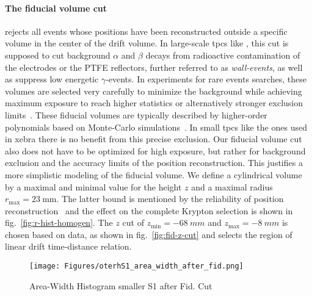 \paragraph{The fiducial volume cut} rejects all events whose positions have been reconstructed outside a specific volume in the center of the drift volume.
In large-scale \glspl{tpc} like \nton, this cut is supposed to cut background $\alpha$ and $\beta$ decays from radioactive contamination of the electrodes or the PTFE reflectors, further referred to as \emph{wall-events}, as well as suppress low energetic $ \gamma $-events.
In experiments for rare events searches, these volumes are selected very carefully to minimize the background while achieving maximum exposure to reach higher statistics or alternatively stronger exclusion limits~\cite{?}.  %
These fiducial volumes are typically described by higher-order polynomials based on Monte-Carlo simulations~\cite{?}. %
In small \glspl{tpc} like the ones used in \gls{xebra} there is no benefit from this precise exclusion.
Our fiducial volume cut also does not have to be optimized for high exposure, but rather for background exclusion and the accuracy limits of the position reconstruction.
This justifies a more simplistic modeling of the fiducial volume.
We define a cylindrical volume by a maximal and minimal value for the height $z$ and a maximal radius $r_\mathrm{max} = \SI{23}{\milli\m}$.
The latter bound is mentioned by the reliability of position reconstruction~\cite{ABism} and the effect on the complete Krypton selection is shown in fig.~\ref{fig:r-hist-homogen}.
The $z$ cut of $ z_\mathrm{min} = \SI{-68}{mm} $ and $ z_\mathrm{max} = \SI{-8}{mm} $ is chosen based on data, as shown in fig.~\ref{fig:fid-z-cut} and selects the region of linear drift time-distance relation.


\begin{figure}[H]
\centering
\texttt{[image: Figures/oterhS1\_area\_width\_after\_fid.png]}  %
\caption[Area-Width Histogram smaller S1 after Fid. Cut]{
    Area-Width Histogram smaller S1 after Fid. Cut
    }
\label{fig:other_s1_area_width}
\end{figure}


